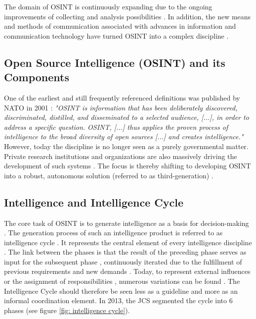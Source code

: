 \documentclass[10pt]{article}
\begin{document}
The domain of OSINT is continuously expanding due to the ongoing improvements of
collecting and analysis possibilities \cite{Ghioni.2023, Williams.2018}. In
addition, the new means and methods of communication associated with advances in information
and communication technology have turned OSINT into a complex discipline
\cite{Benes.2013, Williams.2018}.

\subsection{Open Source Intelligence (OSINT) and its Components}

One of the earliest and still frequently referenced definitions \cite{DosPassos.2017}
was published by NATO in 2001 \cite{NorthAtlanticTreatyOrganization.2001}: \textit{"OSINT is information that has been
    deliberately discovered, discriminated, distilled, and disseminated to a selected audience,
    [...], in order to address a specific question. OSINT, [...] thus applies the proven
    process of intelligence to the broad diversity of open sources [...] and creates
    intelligence."} However, today the discipline is no longer seen as a purely governmental
matter. Private research institutions and organizations \cite{Bohm.2021,Mercado.2005} are
also massively driving the development of such systems
\cite{Dokman.2020, Ghioni.2023}. The focus is thereby shifting to
developing OSINT into a robust, autonomous solution (referred to as third-generation) \cite{PastorGalindo.2019}.

\subsection{Intelligence and Intelligence Cycle}

The core task of OSINT is to generate intelligence
as a basis for decision-making
\cite{Breakspear.2013,NorthAtlanticTreatyOrganization.2001}. The generation process of such an intelligence product
is referred to as intelligence cycle \cite{CentralIntelligenceAgency.1987}.
It represents the central element of every intelligence discipline \cite{Reuser.2017}. The link between the phases is that
the result of the preceding phase serves as input for the subsequent phase
\cite{JointChiefsofStaffU.S.Army.2013}, continuously
iterated due to the fulfillment of previous requirements and new demands \cite{Gibson.2016}.
Today, to represent external influences or the
assignment of responsibilities \cite{Lowenthal.2020,Phythian.2013}, numerous
variations can be found \cite{Reuser.2017}. The
Intelligence Cycle should therefore be seen less as a guideline and more as an informal
coordination element\cite{Hwang.2022}.
In 2013, the JCS segmented the cycle into 6 phases \cite{JointChiefsofStaffU.S.Army.2013} (see figure \ref{fig: intelligence cycle}).
\end{document}
